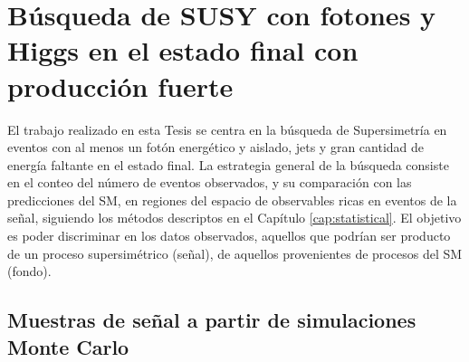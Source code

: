 \chapter{Búsqueda de SUSY con fotones y Higgs en el estado final con producción fuerte}\label{cap:analysis}




El trabajo realizado en esta Tesis se centra en la búsqueda de Supersimetría en eventos con al menos un fotón energético y aislado, jets y gran cantidad de energía faltante en el estado final. La estrategia general de la búsqueda consiste en el conteo del número de eventos observados, y su comparación con las predicciones del SM, en regiones del espacio de observables ricas en eventos de la señal, siguiendo los métodos descriptos en el Capítulo \ref{cap:statistical}. El objetivo es poder discriminar en los datos observados, aquellos que podrían ser producto de un proceso supersimétrico (señal), de aquellos provenientes de procesos del SM (fondo).


\section{Muestras de señal a partir de simulaciones Monte Carlo}\label{sec:signal_samples}

